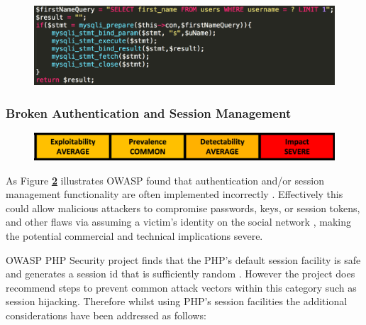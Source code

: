     \begin{figure}[h]
    	\centering
    	\includegraphics[scale=0.61,right]{chapters/chapter03/figures/preparedStmt.png}
    	\label{Example Prepared Statement}
    \end{figure}
    
    \subsubsection{Broken Authentication and Session Management}
    
    \begin{figure}[h]
    	\centering
    	\includegraphics[scale=0.55,center]{chapters/chapter03/figures/xss.png}
    	\label{Broken Authentication and Session Management Classification}
    \end{figure}
    
    
    As  Figure \textbf{ \ref{Broken Authentication and Session Management Classification}} illustrates OWASP found that authentication and/or session management functionality are often implemented incorrectly \cite{OWASP2017}. Effectively this could allow malicious attackers to compromise passwords, keys, or session tokens, and other flaws via assuming a victim's identity on the social network \cite{OWASP2017}, making the potential commercial and technical implications severe.
    
    OWASP PHP Security project finds that the PHP's default session facility is safe and generates a session id that is sufficiently random \cite{OWASPa}. However the project does recommend steps to prevent common attack vectors within this category such as session hijacking. Therefore whilst using PHP's session facilities the additional considerations have been addressed as follows:
    

